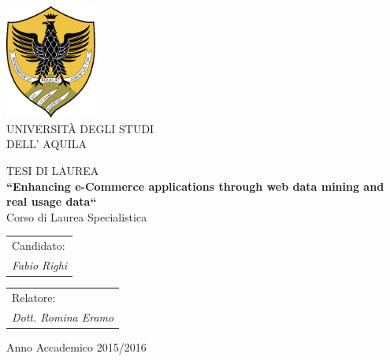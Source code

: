 


\thispagestyle{empty}
\begin{center}

        \includegraphics[width=3cm]{images/logo}\\
\vspace{1cm}
       {\Huge UNIVERSIT\`A DEGLI STUDI}\\
        \vspace{8mm}                                                  %
        {\Huge DELL' AQUILA}\\
        \vspace{1.3cm}
        \vspace{2.2cm}

         {\Large TESI DI LAUREA} \\

        \vspace{8mm}
        {\LARGE \bfseries ``Enhancing e-Commerce applications through web data mining and real usage data``} \\
        \vspace{2.8cm}
        {\large Corso di Laurea Specialistica}\\
        \vspace{18mm}
    \end{center}
\vspace{20mm}
   \begin{tabular}{l}
        { Candidato:}\\
        { \textit{Fabio Righi}}\\
      \end{tabular}
    \hfill
    \begin{tabular}{l}
        { Relatore:}\\
        { \textit{Dott.  Romina Eramo}}\\
    \end{tabular}
\vspace{20mm}
\begin{center}
{\large Anno Accademico 2015/2016}
\end{center}
